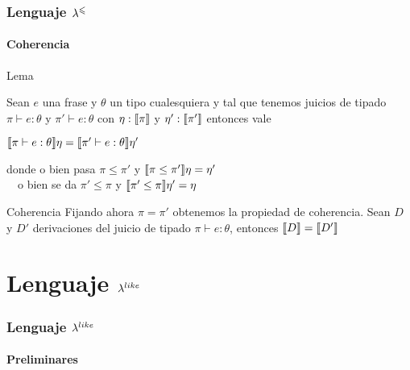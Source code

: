 \documentclass{beamer}
\begin{document}
\begin{frame}
\frametitle{Lenguaje $\lambda^{\leqslant}$}
\framesubtitle{Coherencia}

\begin{block}{Lema}

Sean $e$ una frase y $\theta$ un tipo cualesquiera y tal que tenemos 
juicios de tipado $\pi \vdash e : \theta$ y $\pi' \vdash e : \theta$
con $\eta : \llbracket \pi \rrbracket$ y $\eta' : \llbracket \pi' \rrbracket$ entonces vale

\begin{center}
$\llbracket \pi \vdash e : \theta \rrbracket\eta = \llbracket \pi' \vdash e : \theta \rrbracket\eta'$
\end{center}

\noindent
donde o bien pasa $\pi \leq \pi'$ y $\llbracket \pi \leq \pi' \rrbracket\eta = \eta'$\\
\quad \quad \ \
o bien se da $\pi' \leq \pi$ y $\llbracket \pi' \leq \pi \rrbracket\eta' = \eta$

\end{block}

\begin{block}{Coherencia}
Fijando ahora $\pi = \pi'$ obtenemos la propiedad de coherencia. Sean $D$ y $D'$
derivaciones del juicio de tipado $\pi \vdash e : \theta$, entonces 
$\llbracket D \rrbracket = \llbracket D' \rrbracket$
\end{block}

\end{frame}

\section{Lenguaje $\lambda^{like}$}

\begin{frame}
\frametitle{Lenguaje $\lambda^{like}$}
\framesubtitle{Preliminares}

\begin{block}

\end{block}

\end{frame}
\end{document}
